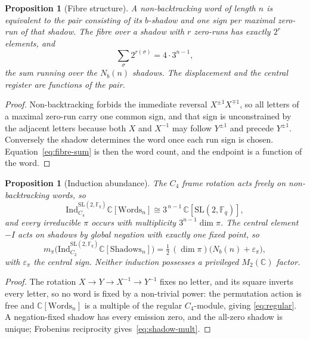 \documentclass[11pt,a4paper]{article}
\newtheorem{proposition}[theorem]{Proposition}
\theoremstyle{definition}
\theoremstyle{remark}
\newcommand{\C}{\mathbb{C}}
\newcommand{\Fq}{\mathbb{F}_q}
\newcommand{\G}{\mathrm{SL}(2,\Fq)}
\newcommand{\Ind}{\mathrm{Ind}}
\begin{document}
\begin{proposition}[Fibre structure]
  \label{prop:fibre-structure}
  A non-backtracking word of length $n$ is equivalent to the pair consisting of its
  $b$-shadow and one sign per maximal zero-run of that shadow.
  The fibre over a shadow with $r$ zero-runs has exactly $2^r$ elements, and
  \begin{equation}
    \sum_{\sigma}2^{r(\sigma)}=4\cdot3^{n-1},
    \label{eq:fibre-sum}
  \end{equation}
  the sum running over the $N_b(n)$ shadows.
  The displacement and the central register are functions of the pair.
\end{proposition}

\begin{proof}
  Non-backtracking forbids the immediate reversal $X^{\pm1}X^{\mp1}$, so all letters of
  a maximal zero-run carry one common sign, and that sign is unconstrained by the
  adjacent letters because both $X$ and $X^{-1}$ may follow $Y^{\pm1}$ and precede
  $Y^{\pm1}$.
  Conversely the shadow determines the word once each run sign is chosen.
  Equation~\eqref{eq:fibre-sum} is then the word count, and the endpoint is a function
  of the word.
\end{proof}

\begin{proposition}[Induction abundance]
  \label{prop:abundance}
  The $C_4$ frame rotation acts freely on non-backtracking words, so
  \begin{equation}
    \Ind_{C_4}^{\G}\C[\mathrm{Words}_n]\cong3^{\,n-1}\,\C[\G],
    \label{eq:regular}
  \end{equation}
  and every irreducible $\pi$ occurs with multiplicity $3^{n-1}\dim\pi$.
  The central element $-I$ acts on shadows by global negation with exactly one fixed
  point, so
  \begin{equation}
    m_\pi\bigl(\Ind_{C_2}^{\G}\C[\mathrm{Shadows}_n]\bigr)
    =\tfrac{1}{2}\,(\dim\pi)\bigl(N_b(n)+\varepsilon_\pi\bigr),
    \label{eq:shadow-mult}
  \end{equation}
  with $\varepsilon_\pi$ the central sign.
  Neither induction possesses a privileged $M_2(\C)$ factor.
\end{proposition}

\begin{proof}
  The rotation $X\to Y\to X^{-1}\to Y^{-1}$ fixes no letter, and its square inverts
  every letter, so no word is fixed by a non-trivial power: the permutation action is
  free and $\C[\mathrm{Words}_n]$ is a multiple of the regular $C_4$-module, giving
  \eqref{eq:regular}.
  A negation-fixed shadow has every emission zero, and the all-zero shadow is unique;
  Frobenius reciprocity gives~\eqref{eq:shadow-mult}.
\end{proof}
\end{document}
